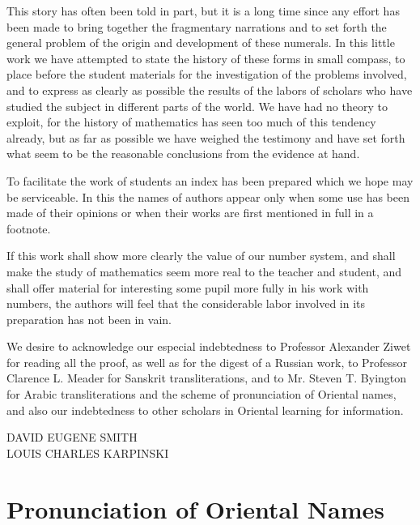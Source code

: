 \documentclass[11pt,a4paper]{article}
\begin{document}
This story has often been told in part, but it is a long time since any effort has been made to bring together the fragmentary narrations and to set forth the general problem of the origin and development of these numerals. In this little work we have attempted to state the history of these forms in small compass, to place before the student materials for the investigation of the problems involved, and to express as clearly as possible the results of the labors of scholars who have studied the subject in different parts of the world. We have had no theory to exploit, for the history of mathematics has seen too much of this tendency already, but as far as possible we have weighed the testimony and have set forth what seem to be the reasonable conclusions from the evidence at hand.

To facilitate the work of students an index has been prepared which we hope may be serviceable. In this the names of authors appear only when some use has been made of their opinions or when their works are first mentioned in full in a footnote.

If this work shall show more clearly the value of our number system, and shall make the study of mathematics seem more real to the teacher and student, and shall offer material for interesting some pupil more fully in his work with numbers, the authors will feel that the considerable labor involved in its preparation has not been in vain.

We desire to acknowledge our especial indebtedness to Professor Alexander Ziwet for reading all the proof, as well as for the digest of a Russian work, to Professor Clarence L. Meader for Sanskrit transliterations, and to Mr. Steven T. Byington for Arabic transliterations and the scheme of pronunciation of Oriental names, and also our indebtedness to other scholars in Oriental learning for information.

\begin{flushright}
DAVID EUGENE SMITH\\
LOUIS CHARLES KARPINSKI
\end{flushright}

\newpage

\tableofcontents
\newpage

\section*{Pronunciation of Oriental Names}
\end{document}
